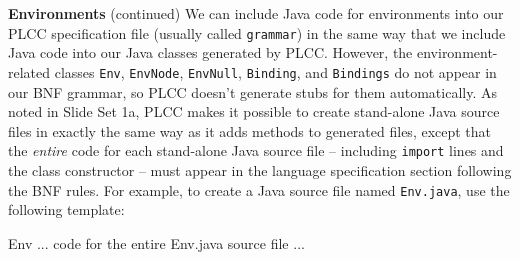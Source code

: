 \begin{minipage}[t]{\sw}
\slidenumber
\LARGE
{\bf Environments} (continued)\exx
We can include Java code for environments
into our PLCC specification file (usually called \verb'grammar')
in the same way that we include Java code
into our Java classes generated by PLCC.
However, the environment-related classes
\verb'Env', \verb'EnvNode', \verb'EnvNull',
\verb'Binding', and \verb'Bindings'
do not appear in our BNF grammar,
so PLCC doesn't generate stubs for them automatically.\exx
As noted in Slide Set 1a,
PLCC makes it possible to create stand-alone Java source files
in exactly the same way as it adds methods to generated files,
except that the {\em entire} code for each stand-alone Java source file --
including \verb'import' lines and the class constructor --
must appear in the language specification section
following the BNF rules.\exx
For example, to create a Java source file named \verb'Env.java',
use the following template:
\begin{qv}
Env
... code for the entire Env.java source file ...
\end{qv}
\end{minipage}
\clearpage
